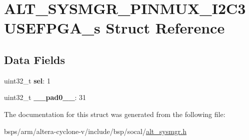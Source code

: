 \hypertarget{structALT__SYSMGR__PINMUX__I2C3USEFPGA__s}{}\section{A\+L\+T\+\_\+\+S\+Y\+S\+M\+G\+R\+\_\+\+P\+I\+N\+M\+U\+X\+\_\+\+I2\+C3\+U\+S\+E\+F\+P\+G\+A\+\_\+s Struct Reference}
\label{structALT__SYSMGR__PINMUX__I2C3USEFPGA__s}
\subsection*{Data Fields}
\begin{DoxyCompactItemize}
\item 
\mbox{\label{structALT__SYSMGR__PINMUX__I2C3USEFPGA__s_acaecf8a38d42884af18b3a6888aae242}} 
uint32\+\_\+t {\bfseries sel}\+: 1
\item 
\mbox{\label{structALT__SYSMGR__PINMUX__I2C3USEFPGA__s_a5b4dfecc81f9e49ac64b542ee63612c9}} 
uint32\+\_\+t {\bfseries \+\_\+\+\_\+pad0\+\_\+\+\_\+}\+: 31
\end{DoxyCompactItemize}


The documentation for this struct was generated from the following file\+:\begin{DoxyCompactItemize}
\item 
bsps/arm/altera-\/cyclone-\/v/include/bsp/socal/\mbox{\hyperlink{alt__sysmgr_8h}{alt\+\_\+sysmgr.\+h}}\end{DoxyCompactItemize}
